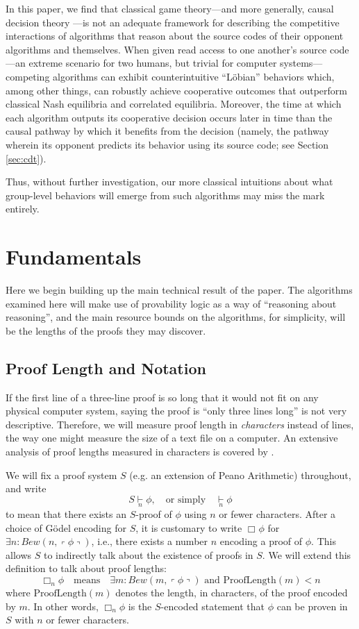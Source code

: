 \documentclass[onecolumn,authordate]{miri-tech-article}
\numberwithin{equation}{section}
\theoremstyle{definition}
\newcommand{\proves}[1]{\underset{#1}{\vdash}}
\newcommand{\bx}[1]{\Box_{#1}}
\newcommand{\qquote}[1]{\left\ulcorner #1 \right\urcorner}
\newcommand{\AND}{{\textrm{ and }}}
\renewcommand{\-}{^{-1}}
\begin{document}
In this paper, we find that classical game theory---and more generally, causal decision theory \citep{Gibbard:1978}---is not an adequate framework for describing the competitive interactions of algorithms that reason about the source codes of their opponent algorithms and themselves. When given read access to one another's source code---an extreme scenario for two humans, but trivial for computer systems---competing algorithms can exhibit counterintuitive ``L\"{o}bian'' behaviors which, among other things, can robustly achieve cooperative outcomes that outperform classical Nash equilibria and correlated equilibria.  Moreover, the time at which each algorithm outputs its cooperative decision occurs later in time than the causal pathway by which it benefits from the decision (namely, the pathway wherein its opponent predicts its behavior using its source code; see Section \ref{sec:cdt}).  

Thus, without further investigation, our more classical intuitions about what group-level behaviors will emerge from such algorithms may miss the mark entirely.

\section{Fundamentals}
Here we begin building up the main technical result of the paper.  The algorithms examined here will make use of provability logic as a way of ``reasoning about reasoning'', and the main resource bounds on the algorithms, for simplicity, will be the lengths of the proofs they may discover.

\subsection{Proof Length and Notation}
If the first line of a three-line proof is so long that it would not fit on any physical computer system, saying the proof is ``only three lines long'' is not very descriptive.  Therefore, we will measure proof length in {\em characters} instead of lines, the way one might measure the size of a text file on a computer.  An extensive analysis of proof lengths measured in characters is covered by \citet{Pudlak:1998}.

We will fix a proof system $S$ (e.g. an extension of Peano Arithmetic) throughout, and write
$$S \proves{n} \phi, \quad \text{or simply} \quad \proves{n} \phi$$
to mean that there exists an $S$-proof of $\phi$ using $n$ or fewer characters.  After a choice of G\"{o}del encoding for $S$, it is customary to write $\bx{}\phi$ for $\exists n : Bew(n,\qquote{\phi})$, i.e., there exists a number $n$ encoding a proof of $\phi$.  This allows $S$ to indirectly talk about the existence of proofs in $S$.  We will extend this definition to talk about proof lengths:
$$\bx{n}\phi \quad \text{means} \quad \exists m : Bew(m,\qquote{\phi}) \AND \mathrm{ProofLength}(m)<n$$
where $\mathrm{ProofLength}(m)$ denotes the length, in characters, of the proof encoded by $m$.  In other words, $\bx{n}\phi$ is the $S$-encoded statement that $\phi$ can be proven in $S$ with $n$ or fewer characters.
\end{document}
